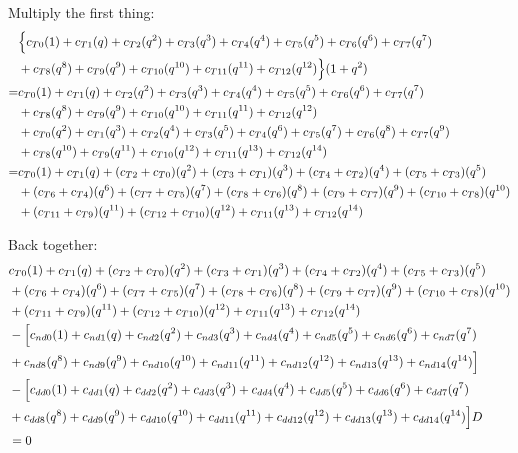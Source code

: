 \documentclass[12pt]{article}
\begin{document}
Multiply the first thing:
\begin{align}
    &\Bigl\{ c_{T0}(1) + c_{T1}(q) + c_{T2}(q^2) + c_{T3}(q^3) + c_{T4}(q^4) + c_{T5}(q^5) + c_{T6}(q^6) + c_{T7}(q^7)\nonumber\\
    &+ c_{T8}(q^8) + c_{T9}(q^9) + c_{T10}(q^{10}) + c_{T11}(q^{11}) + c_{T12}(q^{12}) \Bigr\} (1+q^2)\\
    =&   c_{T0}(1) + c_{T1}(q) + c_{T2}(q^2) + c_{T3}(q^3) + c_{T4}(q^4) + c_{T5}(q^5) + c_{T6}(q^6) + c_{T7}(q^7)\nonumber\\
    &+ c_{T8}(q^8) + c_{T9}(q^9) + c_{T10}(q^{10}) + c_{T11}(q^{11}) + c_{T12}(q^{12}) \nonumber\\
    &+ c_{T0}(q^2) + c_{T1}(q^3) + c_{T2}(q^4) + c_{T3}(q^5) + c_{T4}(q^6) + c_{T5}(q^7) + c_{T6}(q^8) + c_{T7}(q^9)\nonumber\\
    &+ c_{T8}(q^{10}) + c_{T9}(q^{11}) + c_{T10}(q^{12}) + c_{T11}(q^{13}) + c_{T12}(q^{14}) \\
    =&   c_{T0}(1) + c_{T1}(q) + (c_{T2}+ c_{T0})(q^2) + (c_{T3}+c_{T1})(q^3) + (c_{T4}+c_{T2})(q^4) + (c_{T5}+c_{T3})(q^5) \nonumber\\
    &+ (c_{T6}+c_{T4})(q^6) + (c_{T7}+c_{T5})(q^7) + (c_{T8}+c_{T6})(q^8) + (c_{T9}+c_{T7})(q^9) + (c_{T10}+c_{T8})(q^{10}) \nonumber\\
    &+ (c_{T11}+c_{T9})(q^{11}) + (c_{T12}+c_{T10})(q^{12}) + c_{T11}(q^{13}) + c_{T12}(q^{14})
\end{align}

Back together:
\begin{align}
    &  c_{T0}(1) + c_{T1}(q) + (c_{T2}+ c_{T0})(q^2) + (c_{T3}+c_{T1})(q^3) + (c_{T4}+c_{T2})(q^4) + (c_{T5}+c_{T3})(q^5) \nonumber\\
    &+ (c_{T6}+c_{T4})(q^6) + (c_{T7}+c_{T5})(q^7) + (c_{T8}+c_{T6})(q^8) + (c_{T9}+c_{T7})(q^9) + (c_{T10}+c_{T8})(q^{10}) \nonumber\\
    &+ (c_{T11}+c_{T9})(q^{11}) + (c_{T12}+c_{T10})(q^{12}) + c_{T11}(q^{13}) + c_{T12}(q^{14}) \nonumber\\
    &-  \Bigl[ c_{nd0}(1) + c_{nd1}(q) + c_{nd2}(q^2) + c_{nd3}(q^3) + c_{nd4}(q^4) + c_{nd5}(q^5) + c_{nd6}(q^6) + c_{nd7}(q^7) \nonumber\\
    &+ c_{nd8}(q^8) + c_{nd9}(q^9) + c_{nd10}(q^{10}) + c_{nd11}(q^{11}) + c_{nd12}(q^{12}) + c_{nd13}(q^{13}) + c_{nd14}(q^{14}) \Bigr] \nonumber\\
    &- \Bigl[  c_{dd0}(1) + c_{dd1}(q) + c_{dd2}(q^2) + c_{dd3}(q^3) + c_{dd4}(q^4) + c_{dd5}(q^5) + c_{dd6}(q^6) + c_{dd7}(q^7) \nonumber\\
    &+ c_{dd8}(q^8) + c_{dd9}(q^9) + c_{dd10}(q^{10}) + c_{dd11}(q^{11}) + c_{dd12}(q^{12}) + c_{dd13}(q^{13}) + c_{dd14}(q^{14}) \Bigr]D   \nonumber\\
    &= 0
\end{align}
\end{document}
